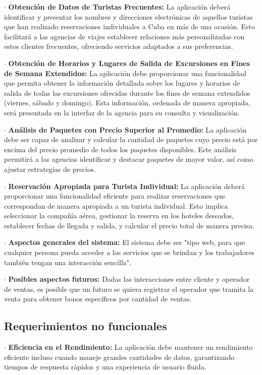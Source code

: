 \documentclass{article}
\begin{document}
    $\cdot$ \textbf{Obtención de Datos de Turistas Frecuentes:}
        La aplicación deberá identificar y presentar los nombres y direcciones electrónicas de 
        aquellos turistas que han realizado reservaciones individuales a Cuba en más de una ocasión. 
        Esto facilitará a las agencias de viajes establecer relaciones más personalizadas con estos clientes 
        frecuentes, ofreciendo servicios adaptados a sus preferencias.

    $\cdot$ \textbf{Obtención de Horarios y Lugares de Salida de Excursiones en Fines de Semana Extendidos:}
        La aplicación debe proporcionar una funcionalidad que permita obtener la información detallada 
        sobre los lugares y horarios de salida de todas las excursiones ofrecidas durante los fines de 
        semana extendidos (viernes, sábado y domingo). Esta información, ordenada de manera apropiada, 
        será presentada en la interfaz de la agencia para su consulta y visualización.

    $\cdot$ \textbf{Análisis de Paquetes con Precio Superior al Promedio:}
        La aplicación debe ser capaz de analizar y calcular la cantidad de paquetes cuyo precio está por encima 
        del precio promedio de todos los paquetes disponibles. Este análisis permitirá a las agencias identificar 
        y destacar paquetes de mayor valor, así como ajustar estrategias de precios.

    $\cdot$ \textbf{Reservación Apropiada para Turista Individual:}
        La aplicación deberá proporcionar una funcionalidad eficiente para realizar reservaciones que 
        correspondan de manera apropiada a un turista individual. Esto implica seleccionar la compañía 
        aérea, gestionar la reserva en los hoteles deseados, establecer fechas de llegada y salida, y calcular 
        el precio total de manera precisa.

    $\cdot$ \textbf{Aspectos generales del sistema: }
        El sistema debe ser "tipo web, para que cualquier persona pueda acceder a los servicios que se brindan 
        y los trabajadores también tengan una interacción sencilla". 
    
    $\cdot$ \textbf{Posibles aspectos futuros: }
        Dadas las interacciones entre cliente y operador de ventas, es posible que un futuro se quiera registrar 
        el operador que tramita la venta para obtener bonos específicos por cantidad de ventas.

\subsection{Requerimientos no funcionales}
    $\cdot$ \textbf{Eficiencia en el Rendimiento:}
        La aplicación debe mantener un rendimiento eficiente incluso cuando maneje grandes cantidades de datos, 
        garantizando tiempos de respuesta rápidos y una experiencia de usuario fluida.
\end{document}
